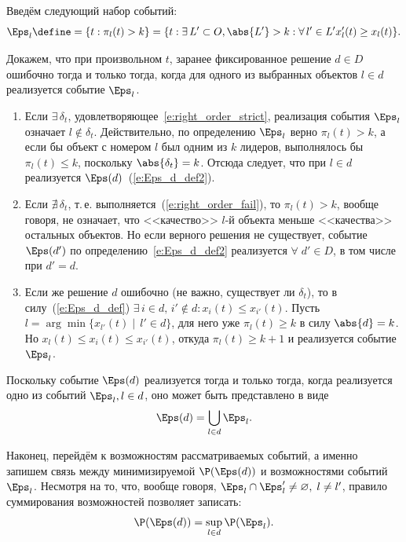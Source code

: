 Введём следующий набор событий:
\begin{equation}
  \label{e:Eps_l_def}
  \Eps_l \define= \{t: \pi_l(t) > k\} = \{t: \exists\, L' \subset O, \abs{L'} > k: \forall\, l' \in L' x_l'(t) \geq x_{l}(t)\}.
\end{equation}

Докажем, что при произвольном $t$, заранее фиксированное решение $d \in D$ ошибочно тогда и только тогда, когда для одного из выбранных объектов $l \in d$ реализуется событие $\Eps_l$.
\begin{enumerate}
  \item Если $\exists\, \delta_t$, удовлетворяющее~\eqref{e:right_order_strict}, реализация события $\Eps_l$ означает $l \notin \delta_t$.
  Действительно, по определению $\Eps_l$ верно $\pi_l(t) > k$, а если бы объект с номером $l$ был одним из $k$ лидеров, выполнялось бы $\pi_l(t) \leq k$, поскольку $\abs{\delta_t} = k$. Отсюда следует, что при $l \in d$ реализуется $\Eps(d)$~(\ref{e:Eps_d_def2}).
  \item Если $\nexists\, \delta_t$, т.\,е. выполняется~(\ref{e:right_order_fail}), то $\pi_l(t) > k$, вообще говоря, не означает, что <<качество>> $l$-й объекта меньше <<качества>> остальных объектов. Но если верного решения не существует, событие $\Eps(d')$ по определению~\eqref{e:Eps_d_def2} реализуется $\forall\; d' \in D$, в том числе при $d' = d$. 
  \item Если же решение $d$ ошибочно (не важно, существует ли $\delta_t$), то в силу~(\ref{e:Eps_d_def}) $\exists\, i \in d,\, i' \notin d: x_i(t) \leq x_{i'}(t)$. %
  Пусть $l = \arg\min \{x_{l'}(t)\mid\,l' \in d\}$, для него уже $\pi_l(t) \geq k$ в силу $\abs{d} = k$. Но $x_l(t) \leq x_i(t) \leq x_{i'}(t)$, откуда $\pi_l(t) \geq k+1$ и реализуется событие $\Eps_l$.     
\end{enumerate}

Поскольку событие $\Eps(d)$ реализуется тогда и только тогда, когда реализуется одно из событий $\Eps_l, l \in d$, оно может быть представлено в виде
\begin{equation*}
  \Eps(d) = \bigcup_{l \in d} \Eps_l.
\end{equation*}

Наконец, перейдём к возможностям рассматриваемых событий, а именно запишем связь между минимизируемой $\P(\Eps(d))$ и возможностями событий $\Eps_l$. Несмотря на то, что, вообще говоря, $\Eps_l \cap \Eps_l' \neq \varnothing,\; l \neq l'$, правило суммирования возможностей позволяет записать:
\begin{equation}
  \label{e:razbienie}
  \P(\Eps(d)) = \sup_{l \in d} \P(\Eps_l).
\end{equation}

